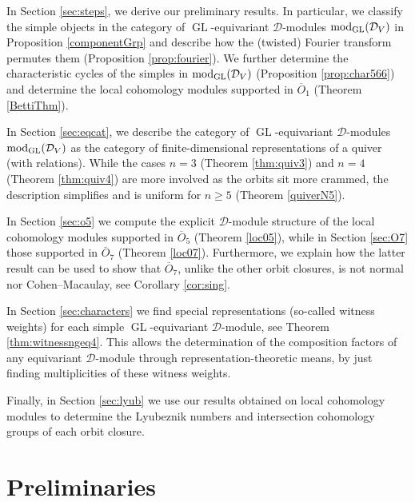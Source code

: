 \documentclass[11pt,reqno]{amsart}
\newcommand{\D}{\mathcal{D}}
\newcommand{\tn}{\textnormal}
\newcommand{\GL}{\operatorname{GL}}
\newcommand{\ol}[1]{\overline{#1}}
\numberwithin{equation}{section}
\begin{document}
\smallskip

In Section \ref{sec:steps}, we derive our preliminary results. In particular, we classify the simple objects in the category of $\GL$-equivariant $\D$-modules $\tn{mod}_{\GL}(\D_V)$ in Proposition \ref{componentGrp} and describe how the (twisted) Fourier transform permutes them (Proposition \ref{prop:fourier}). We further determine the characteristic cycles of the simples in $\tn{mod}_{\GL}(\D_V)$ (Proposition \ref{prop:char566}) and determine the local cohomology modules supported in $\ol{O}_1$ (Theorem \ref{BettiThm}).

\smallskip

In Section \ref{sec:eqcat}, we describe the category of $\GL$-equivariant $\D$-modules $\tn{mod}_{\GL}(\D_V)$ as the category of finite-dimensional representations of a quiver (with relations). While the cases $n=3$ (Theorem \ref{thm:quiv3}) and $n=4$ (Theorem \ref{thm:quiv4}) are more involved as the orbits sit more crammed, the description simplifies and is uniform for $n\geq 5$ (Theorem \ref{quiverN5}).

\smallskip

In Section \ref{sec:o5} we compute the explicit $\D$-module structure of the local cohomology modules supported in $\ol{O}_5$ (Theorem \ref{loc05}), while in Section \ref{sec:O7} those supported in $\ol{O}_7$ (Theorem \ref{loc07}). Furthermore, we explain how the latter result can be used to show that $\ol{O}_7$, unlike the other orbit closures, is not normal nor Cohen--Macaulay, see Corollary \ref{cor:sing}.

\smallskip

In Section \ref{sec:characters} we find special representations (so-called witness weights) for each simple $\GL$-equivariant $\D$-module, see Theorem \ref{thm:witnessngeq4}. This allows the determination of the composition factors of any equivariant $\D$-module through representation-theoretic means, by just finding multiplicities of these witness weights.

\smallskip

Finally, in Section \ref{sec:lyub} we use our results obtained on local cohomology modules to determine the Lyubeznik numbers and intersection cohomology groups of each orbit closure.

\section{Preliminaries}\label{sec:prelim}
\end{document}
